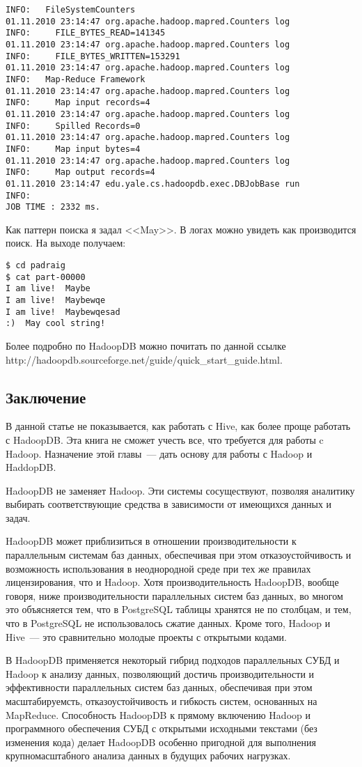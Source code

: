 \begin{lstlisting}[label=lst:haddop27:2,caption=Тестирование]
INFO:   FileSystemCounters
01.11.2010 23:14:47 org.apache.hadoop.mapred.Counters log
INFO:     FILE_BYTES_READ=141345
01.11.2010 23:14:47 org.apache.hadoop.mapred.Counters log
INFO:     FILE_BYTES_WRITTEN=153291
01.11.2010 23:14:47 org.apache.hadoop.mapred.Counters log
INFO:   Map-Reduce Framework
01.11.2010 23:14:47 org.apache.hadoop.mapred.Counters log
INFO:     Map input records=4
01.11.2010 23:14:47 org.apache.hadoop.mapred.Counters log
INFO:     Spilled Records=0
01.11.2010 23:14:47 org.apache.hadoop.mapred.Counters log
INFO:     Map input bytes=4
01.11.2010 23:14:47 org.apache.hadoop.mapred.Counters log
INFO:     Map output records=4
01.11.2010 23:14:47 edu.yale.cs.hadoopdb.exec.DBJobBase run
INFO: 
JOB TIME : 2332 ms.
\end{lstlisting}

Как паттерн поиска я задал <<May>>. В логах можно увидеть как производится поиск. На выходе получаем:
\begin{lstlisting}[label=lst:haddop26:3,caption=Тестирование]
$ cd padraig
$ cat part-00000
I am live!	Maybe
I am live!	Maybewqe
I am live!	Maybewqesad
:)	May cool string!
\end{lstlisting}

Более подробно по HadoopDB можно почитать по данной ссылке \\http://hadoopdb.sourceforge.net/guide/quick\_start\_guide.html.


\subsection{Заключение}
В данной статье не показывается, как работать с Hive, как более проще работать с HadoopDB. Эта книга не сможет учесть все, 
что требуется для работы c Hadoop. Назначение этой главы~--- дать основу для работы с Hadoop и HaddopDB.

HadoopDB не заменяет Hadoop. Эти системы сосуществуют, позволяя аналитику выбирать соответствующие средства в зависимости 
от имеющихся данных и задач.

HadoopDB может приблизиться в отношении производительности к параллельным системам 
баз данных, обеспечивая при этом отказоустойчивость и возможность использования в неоднородной среде при тех же правилах 
лицензирования, что и Hadoop. Хотя производительность HadoopDB, вообще говоря, ниже производительности параллельных систем 
баз данных, во многом это объясняется тем, что в PostgreSQL таблицы хранятся не по столбцам, и тем, что в PostgreSQL 
не использовалось сжатие данных. Кроме того, Hadoop и Hive~--- это сравнительно молодые проекты с открытыми кодами. 

В HadoopDB применяется некоторый гибрид подходов параллельных СУБД и Hadoop к анализу данных, позволяющий достичь производительности 
и эффективности параллельных систем баз данных, обеспечивая при этом масштабируемсть, отказоустойчивость и гибкость систем, 
основанных на MapReduce. Способность HadoopDB к прямому включению Hadoop и программного обеспечения СУБД с открытыми исходными 
текстами (без изменения кода) делает HadoopDB особенно пригодной для выполнения крупномасштабного анализа данных в будущих 
рабочих нагрузках.